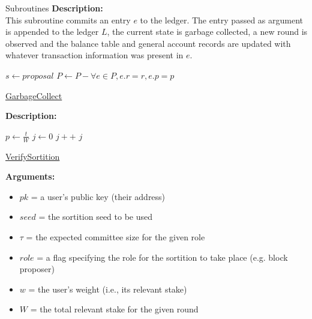 \documentclass[10pt,a4paper]{article}
\begin{document}
\begin{section}{Subroutines}
\noindent \textbf{Description:}\\
This subroutine commits an entry $e$ to the ledger. The entry passed as argument is appended to the ledger $L$,
the current state is garbage collected, a new round is observed and the balance table and general
account records are updated with whatever transaction information was present in $e$.


\begin{algorithm}[H]
    \begin{algorithmic}[1]

    \State $s \gets proposal$
    \State $P \gets P - {\forall e \in P, e.r=r, e.p = p}$


    \EndFunction
    \end{algorithmic}
    \caption{\underline{GarbageCollect}}
\end{algorithm}

\noindent \textbf{Description:}\\




\begin{algorithm}[H]
    \begin{algorithmic}[1]
        \State $p \gets \frac{t}{W}$
        \State $j \gets 0$
        \While{$\frac{hash}{2^{hashlen}} \notin [\sum_{k=0}^j\mathsf{B}(k;w,p), \sum_{k=0}^{j+1}\mathsf{B}(k;w,p))$}
            \State $j++$
        \EndWhile
        \Return $j$
    \EndFunction
    \end{algorithmic}
    \caption{\underline{VerifySortition}}
\end{algorithm}

\noindent \textbf{Arguments:}
\begin{itemize}
    \item $pk$ = a user's public key (their address)
    \item $seed$ = the sortition seed to be used
    \item $\tau$ = the expected committee size for the given role
    \item $role$ = a flag specifying the role for the sortition to take place (e.g. block proposer)
    \item $w$ = the user's weight (i.e., its relevant stake)
    \item $W$ = the total relevant stake for the given round
  \end{itemize}


\end{section}
\end{document}
